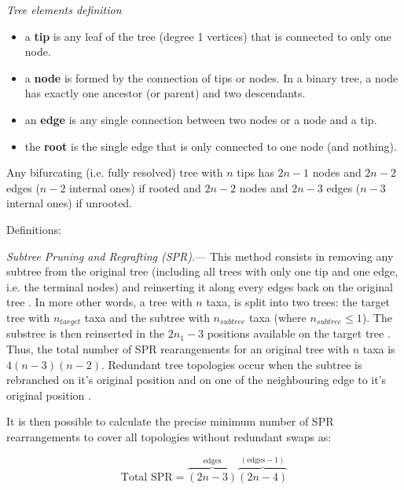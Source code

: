 \documentclass[12pt,letterpaper]{article}
\renewcommand{\subsection}[1]{%
\bigskip
\begin{center}
\begin{large}
\normalfont\itshape #1
\end{large}
\end{center}}
\renewcommand{\subsubsection}[1]{%
\vspace{2ex}
\noindent
\textit{#1.}---}
\begin{document}
\subsection{Tree elements definition}
\begin{itemize}
    \item a \textbf{tip} is any leaf of the tree (degree 1 vertices) that is connected to only one node.
    \item a \textbf{node} is formed by the connection of tips or nodes. In a binary tree, a node has exactly one ancestor (or parent) and two descendants.
    \item an \textbf{edge} is any single connection between two nodes or a node and a tip.
    \item the \textbf{root} is the single edge that is only connected to one node (and nothing).
\end{itemize}
Any bifurcating (i.e. fully resolved) tree with $n$ tips has $2n-1$ nodes and $2n-2$ edges ($n-2$ internal ones) if rooted and $2n-2$ nodes and $2n-3$ edges ($n-3$ internal ones) if unrooted.

Definitions: \cite{allen2001subtree,felsenstein2004inferring}

\subsubsection{Subtree Pruning and Regrafting (SPR)}
This method consists in removing any subtree from the original tree (including all trees with only one tip and one edge, i.e. the terminal nodes) and reinserting it along every edges back on the original tree \citep[see Fig \ref{Figure_Felsenstein};]{felsenstein2004inferring}.
In more other words, a tree with $n$ taxa, is split into two trees: the target tree with $n_{target}$ taxa and the subtree with $n_{subtree}$ taxa (where $n_{subtree} \leq 1$).
The substree is then reinserted in the $2n_{1}-3$ positions available on the target tree \citep{felsenstein2004inferring}.
Thus, the total number of SPR rearangements for an original tree with $n$ taxa is $4(n-3)(n-2)$.
Redundant tree topologies occur when the subtree is rebranched on it's original position and on one of the neighbouring edge to it's original position \citep{allen2001subtree}.

It is then possible to calculate the precise minimum number of SPR rearrangements to cover all topologies without redundant swaps as:

\begin{equation}
    \text{Total SPR}={\overbrace{(2n-3)}^{\text{edges}}} {\overbrace{(2n-4)}^{(\text{edges} - 1)}} %
\end{equation}
\end{document}
